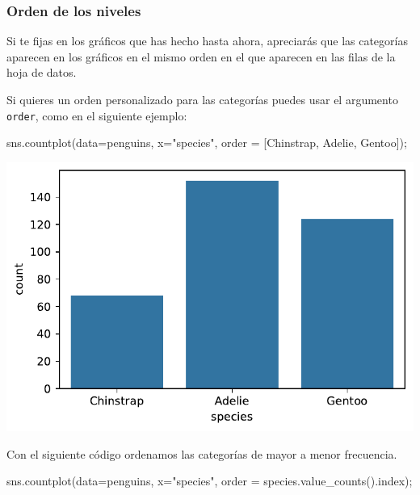 \documentclass[
  a4paper,
  noprof,
  12pt,
  notoc,
  nosols,
  nobib]{mnye}
\newenvironment{Shaded}{\begin{snugshade}}{\end{snugshade}}
\newcommand{\NormalTok}[1]{\textcolor[rgb]{0.00,0.23,0.31}{#1}}
\newcommand{\OperatorTok}[1]{\textcolor[rgb]{0.37,0.37,0.37}{#1}}
\newcommand{\StringTok}[1]{\textcolor[rgb]{0.13,0.47,0.30}{#1}}
\theoremstyle{definition}
\theoremstyle{remark}
\begin{document}
\subsubsection{Orden de los niveles}\label{orden-de-los-niveles}

Si te fijas en los gráficos que has hecho hasta ahora, apreciarás que
las categorías aparecen en los gráficos en el mismo orden en el que
aparecen en las filas de la hoja de datos.

Si quieres un orden personalizado para las categorías puedes usar el
argumento \texttt{order}, como en el siguiente ejemplo:

\begin{Shaded}
\begin{Highlighting}[]
\NormalTok{sns.countplot(data}\OperatorTok{=}\NormalTok{penguins, x}\OperatorTok{=}\StringTok{"species"}\NormalTok{, order }\OperatorTok{=}\NormalTok{ [}\StringTok{\textquotesingle{}Chinstrap\textquotesingle{}}\NormalTok{, }\StringTok{\textquotesingle{}Adelie\textquotesingle{}}\NormalTok{, }\StringTok{\textquotesingle{}Gentoo\textquotesingle{}}\NormalTok{])}\OperatorTok{;}
\end{Highlighting}
\end{Shaded}

\includegraphics{chapters/1categorical_files/figure-pdf/cell-13-output-1.pdf}

Con el siguiente código ordenamos las categorías de mayor a menor
frecuencia.

\begin{Shaded}
\begin{Highlighting}[]
\NormalTok{sns.countplot(data}\OperatorTok{=}\NormalTok{penguins, x}\OperatorTok{=}\StringTok{"species"}\NormalTok{, order }\OperatorTok{=}\NormalTok{ species.value\_counts().index)}\OperatorTok{;}
\end{Highlighting}
\end{Shaded}
\end{document}
